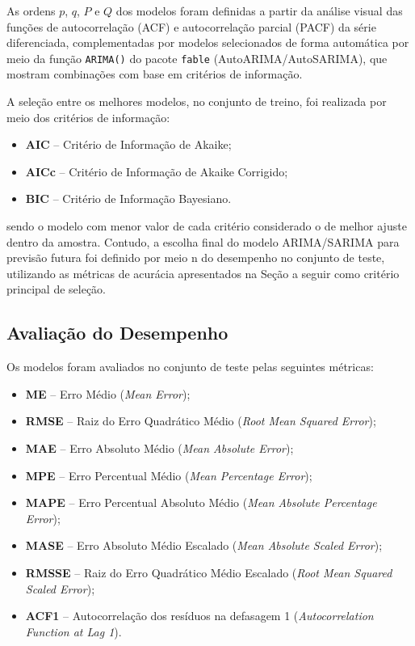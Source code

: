 \documentclass[12pt, a4paper]{article}
\newcommand{\pkg}[1]{\texttt{#1}}
\begin{document}
As ordens $p$, $q$, $P$ e $Q$ dos modelos foram definidas a partir da análise visual das funções de autocorrelação (ACF) e autocorrelação parcial (PACF) da série diferenciada, complementadas por modelos selecionados de forma automática por meio da função \texttt{ARIMA()} do pacote \pkg{fable} (AutoARIMA/AutoSARIMA), que mostram combinações com base em critérios de informação.

A seleção entre os melhores modelos, no conjunto de treino, foi realizada por meio dos critérios de informação:
\begin{itemize}
  \item \textbf{AIC} -- Critério de Informação de Akaike;
  \item \textbf{AICc} -- Critério de Informação de Akaike Corrigido;
  \item \textbf{BIC} -- Critério de Informação Bayesiano.
\end{itemize}
sendo o modelo com menor valor de cada critério considerado o de melhor ajuste dentro da amostra. Contudo, a escolha final do modelo ARIMA/SARIMA para previsão futura foi definido por meio n
do desempenho no conjunto de teste, utilizando as métricas de acurácia apresentados na Seção a seguir como critério principal de seleção.

\subsection{Avaliação do Desempenho}

Os modelos foram avaliados no conjunto de teste pelas seguintes
métricas:
\begin{itemize}
  \item \textbf{ME} -- Erro Médio (\textit{Mean Error});
  \item \textbf{RMSE} -- Raiz do Erro Quadrático Médio (\textit{Root Mean Squared Error});
  \item \textbf{MAE} -- Erro Absoluto Médio (\textit{Mean Absolute Error});
  \item \textbf{MPE} -- Erro Percentual Médio (\textit{Mean Percentage Error});
  \item \textbf{MAPE} -- Erro Percentual Absoluto Médio (\textit{Mean Absolute Percentage Error});
  \item \textbf{MASE} -- Erro Absoluto Médio Escalado (\textit{Mean Absolute Scaled Error});
  \item \textbf{RMSSE} -- Raiz do Erro Quadrático Médio Escalado (\textit{Root Mean Squared Scaled Error});
  \item \textbf{ACF1} -- Autocorrelação dos resíduos na defasagem 1 (\textit{Autocorrelation Function at Lag 1}).
\end{itemize}
\end{document}
